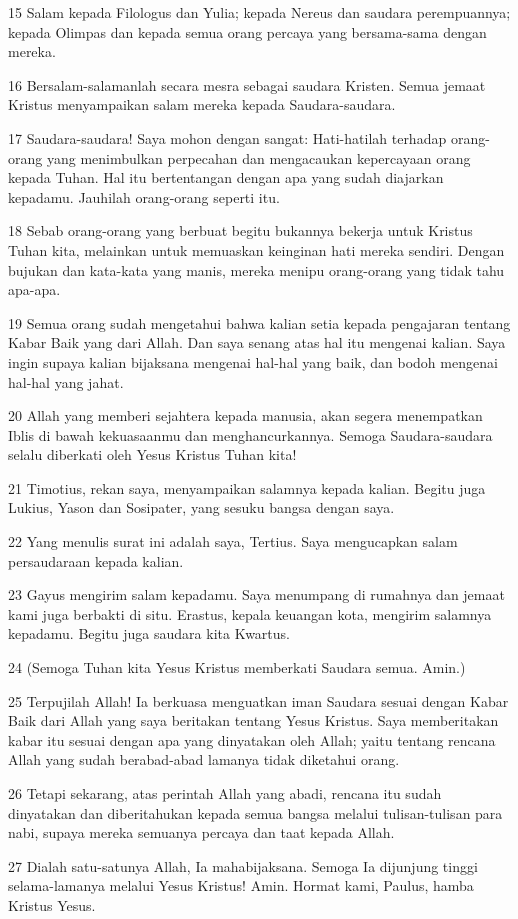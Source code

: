 \par 15 Salam kepada Filologus dan Yulia; kepada Nereus dan saudara perempuannya; kepada Olimpas dan kepada semua orang percaya yang bersama-sama dengan mereka.
\par 16 Bersalam-salamanlah secara mesra sebagai saudara Kristen. Semua jemaat Kristus menyampaikan salam mereka kepada Saudara-saudara.
\par 17 Saudara-saudara! Saya mohon dengan sangat: Hati-hatilah terhadap orang-orang yang menimbulkan perpecahan dan mengacaukan kepercayaan orang kepada Tuhan. Hal itu bertentangan dengan apa yang sudah diajarkan kepadamu. Jauhilah orang-orang seperti itu.
\par 18 Sebab orang-orang yang berbuat begitu bukannya bekerja untuk Kristus Tuhan kita, melainkan untuk memuaskan keinginan hati mereka sendiri. Dengan bujukan dan kata-kata yang manis, mereka menipu orang-orang yang tidak tahu apa-apa.
\par 19 Semua orang sudah mengetahui bahwa kalian setia kepada pengajaran tentang Kabar Baik yang dari Allah. Dan saya senang atas hal itu mengenai kalian. Saya ingin supaya kalian bijaksana mengenai hal-hal yang baik, dan bodoh mengenai hal-hal yang jahat.
\par 20 Allah yang memberi sejahtera kepada manusia, akan segera menempatkan Iblis di bawah kekuasaanmu dan menghancurkannya. Semoga Saudara-saudara selalu diberkati oleh Yesus Kristus Tuhan kita!
\par 21 Timotius, rekan saya, menyampaikan salamnya kepada kalian. Begitu juga Lukius, Yason dan Sosipater, yang sesuku bangsa dengan saya.
\par 22 Yang menulis surat ini adalah saya, Tertius. Saya mengucapkan salam persaudaraan kepada kalian.
\par 23 Gayus mengirim salam kepadamu. Saya menumpang di rumahnya dan jemaat kami juga berbakti di situ. Erastus, kepala keuangan kota, mengirim salamnya kepadamu. Begitu juga saudara kita Kwartus.
\par 24 (Semoga Tuhan kita Yesus Kristus memberkati Saudara semua. Amin.)
\par 25 Terpujilah Allah! Ia berkuasa menguatkan iman Saudara sesuai dengan Kabar Baik dari Allah yang saya beritakan tentang Yesus Kristus. Saya memberitakan kabar itu sesuai dengan apa yang dinyatakan oleh Allah; yaitu tentang rencana Allah yang sudah berabad-abad lamanya tidak diketahui orang.
\par 26 Tetapi sekarang, atas perintah Allah yang abadi, rencana itu sudah dinyatakan dan diberitahukan kepada semua bangsa melalui tulisan-tulisan para nabi, supaya mereka semuanya percaya dan taat kepada Allah.
\par 27 Dialah satu-satunya Allah, Ia mahabijaksana. Semoga Ia dijunjung tinggi selama-lamanya melalui Yesus Kristus! Amin. Hormat kami, Paulus, hamba Kristus Yesus.


